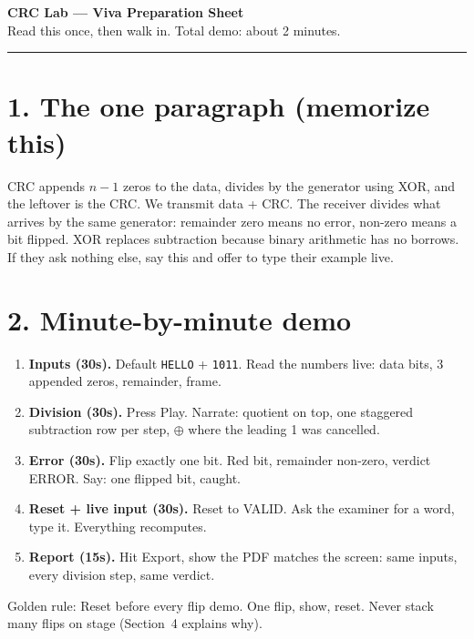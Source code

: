 \documentclass[11pt,a4paper]{article}
\begin{document}
\begin{center}
{\Large\bfseries CRC Lab --- Viva Preparation Sheet} \\[0.4em]
{\normalsize Read this once, then walk in. Total demo: about 2 minutes.}
\end{center}

\vspace{0.5em}
\hrule
\vspace{1em}

\section*{1. The one paragraph (memorize this)}

CRC appends $n-1$ zeros to the data, divides by the generator using XOR,
and the leftover is the CRC. We transmit data + CRC. The receiver divides
what arrives by the same generator: remainder zero means no error,
non-zero means a bit flipped. XOR replaces subtraction because binary
arithmetic has no borrows. If they ask nothing else, say this and offer to
type their example live.

\section*{2. Minute-by-minute demo}

\begin{enumerate}[leftmargin=1.5em]
  \item \textbf{Inputs (30s).} Default \texttt{HELLO} + \texttt{1011}.
  Read the numbers live: data bits, 3 appended zeros, remainder, frame.
  \item \textbf{Division (30s).} Press Play. Narrate: quotient on top,
  one staggered subtraction row per step, $\oplus$ where the leading 1
  was cancelled.
  \item \textbf{Error (30s).} Flip exactly one bit. Red bit, remainder
  non-zero, verdict ERROR. Say: one flipped bit, caught.
  \item \textbf{Reset + live input (30s).} Reset to VALID. Ask the
  examiner for a word, type it. Everything recomputes.
  \item \textbf{Report (15s).} Hit Export, show the PDF matches the
  screen: same inputs, every division step, same verdict.
\end{enumerate}

Golden rule: Reset before every flip demo. One flip, show, reset. Never
stack many flips on stage (Section~4 explains why).
\end{document}

